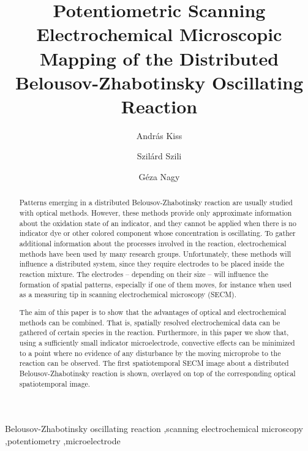 \documentclass[3p, twocolumn]{elsarticle}
\begin{document}
\begin{frontmatter}

\title{Potentiometric Scanning Electrochemical Microscopic Mapping of the Distributed Belousov-Zhabotinsky Oscillating Reaction}
\author[akiss]{András Kiss}
\author[szszilard]{Szilárd Szili}
\address[akiss, gnagy, szszilard]{Department of General and Physical Chemistry, Faculty of Sciences, University of Pécs, 7624 Pécs, Ifjúság útja 6, Hungary}
\address[akiss, gnagy]{János Szentágothai Research Centre, University of Pécs, 7624 Pécs, Ifjúság Útja 20, Hungary}
\author[gnagy]{Géza Nagy}

\begin{abstract}

Patterns emerging in a distributed Belousov-Zhabotinsky reaction are usually studied with optical methods.
However, these methods provide only approximate information about the oxidation state of an indicator, and they cannot be applied when there is no indicator dye or other colored component whose concentration is oscillating.
To gather additional information about the processes involved in the reaction, electrochemical methods have been used by many research groups.
Unfortunately, these methods will influence a distributed system, since they require electrodes to be placed inside the reaction mixture.
The electrodes -- depending on their size -- will influence the formation of spatial patterns, especially if one of them moves, for instance when used as a measuring tip in scanning electrochemical microscopy (SECM).

The aim of this paper is to show that the advantages of optical and electrochemical methods can be combined.
That is, spatially resolved electrochemical data can be gathered of certain species in the reaction.
Furthermore, in this paper we show that, using a sufficiently small indicator microelectrode, convective effects can be minimized to a point where no evidence of any disturbance by the moving microprobe to the reaction can be observed.
The first spatiotemporal SECM image about a distributed Belousov-Zhabotinsky reaction is shown, overlayed on top of the corresponding optical spatiotemporal image.

\end{abstract}
\begin{keyword}
	Belousov-Zhabotinsky oscillating reaction \sep scanning electrochemical microscopy \sep potentiometry \sep microelectrode
\end{keyword}
\end{frontmatter}
\end{document}
